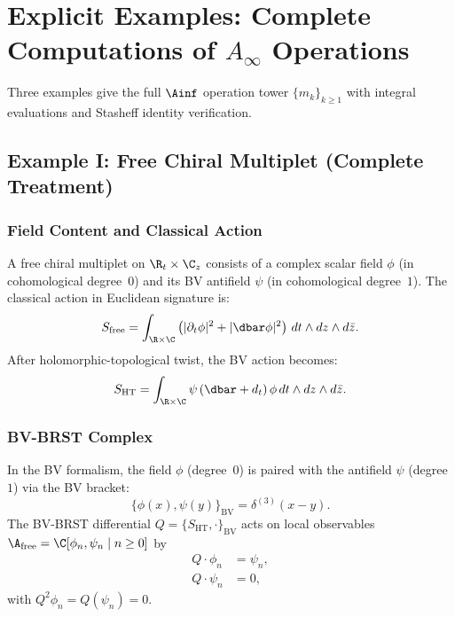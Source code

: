 \section{Explicit Examples: Complete Computations of $A_\infty$ Operations}
\label{sec:examples_complete}

Three examples give the full $\Ainf$ operation tower $\{m_k\}_{k \ge 1}$ with integral evaluations and Stasheff identity verification.
\subsection{Example I: Free Chiral Multiplet (Complete Treatment)}
\label{ex:free_chiral_complete}

\subsubsection{Field Content and Classical Action}
A free chiral multiplet on $\R_t \times \C_z$ consists of a complex scalar field $\phi$ (in cohomological degree~$0$) and its BV antifield $\psi$ (in cohomological degree~$1$). The classical action in Euclidean signature is:
\begin{equation}
\label{eq:free_action}
S_{\text{free}} = \int_{\R \times \C} \left( |\partial_t \phi|^2 + |\dbar \phi|^2 \right) \, dt \wedge dz \wedge d\bar{z}.
\end{equation}
After holomorphic-topological twist, the BV action becomes:
\begin{equation}
S_{\text{HT}} = \int_{\R \times \C} \psi \,(\dbar + d_t)\, \phi \, dt \wedge dz \wedge d\bar{z}.
\end{equation}
\subsubsection{BV-BRST Complex}

In the BV formalism, the field $\phi$ (degree~$0$) is paired with the antifield $\psi$ (degree~$1$) via the BV bracket:
\begin{equation}
\{\phi(x), \psi(y)\}_{\mathrm{BV}} = \delta^{(3)}(x-y).
\end{equation}
The BV-BRST differential $Q = \{S_{\text{HT}}, \cdot\}_{\mathrm{BV}}$ acts on local observables $\A_{\text{free}} = \C[\phi_n, \psi_n \mid n \geq 0]$ by
\begin{align}
Q \cdot \phi_n &= \psi_n, \label{eq:Q_free_phi} \\
Q \cdot \psi_n &= 0, \label{eq:Q_free_psi}
\end{align}
with $Q^2\phi_n = Q(\psi_n) = 0$.

